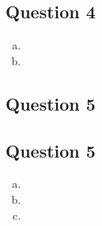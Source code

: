\documentclass{article}
\begin{document}

\subsection*{Question 4}

\begin{enumerate}[(a)]
	\item 
	
	
	\item 
	
	
\end{enumerate}


\subsection*{Question 5}



\subsection*{Question 5}

\begin{enumerate}[(a)]
	\item 
	
	
	\item 
	
	
	\item 
	
	
\end{enumerate}


\end{document}
